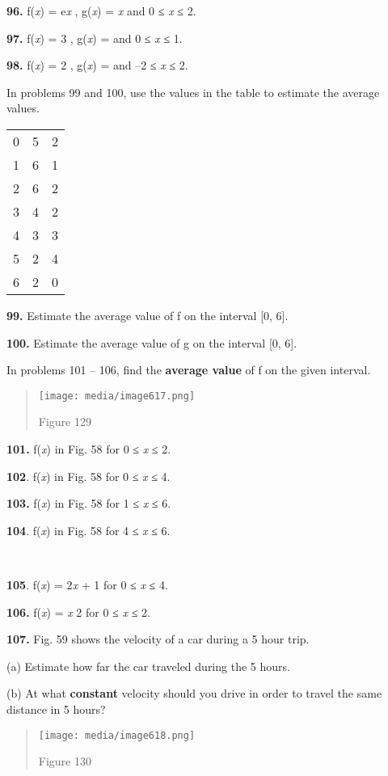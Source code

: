 \textbf{96.} f(\emph{x}) = e\emph{x} , g(\emph{x}) = \emph{x} and 0 ≤
\emph{x} ≤ 2.

\textbf{97.} f(\emph{x}) = 3 , g(\emph{x}) = and 0 ≤ \emph{x} ≤ 1.

\textbf{98.} f(\emph{x}) = 2 , g(\emph{x}) = and --2 ≤ \emph{x} ≤ 2.

In problems 99 and 100, use the values in the table to estimate the
average values.

\begin{longtable}[]{@{}lll@{}}
\toprule
0 & 5 & 2\tabularnewline
1 & 6 & 1\tabularnewline
2 & 6 & 2\tabularnewline
3 & 4 & 2\tabularnewline
4 & 3 & 3\tabularnewline
5 & 2 & 4\tabularnewline
6 & 2 & 0\tabularnewline
\bottomrule
\end{longtable}

\textbf{99.} Estimate the average value of f on the interval {[}0, 6{]}.

\textbf{100.} Estimate the average value of g on the interval {[}0,
6{]}.

In problems 101 -- 106, find the \textbf{average value} of f on the
given interval.

\begin{quote}
\texttt{[image: media/image617.png]}

Figure 129
\end{quote}

\textbf{101.} f(\emph{x}) in Fig. 58 for 0 ≤ \emph{x} ≤ 2.

\textbf{102}. f(\emph{x}) in Fig. 58 for 0 ≤ \emph{x} ≤ 4.

\textbf{103.} f(\emph{x}) in Fig. 58 for 1 ≤ \emph{x} ≤ 6.

\textbf{104}. f(\emph{x}) in Fig. 58 for 4 ≤ \emph{x} ≤ 6.

\textbf{\\
}

\textbf{105}. f(\emph{x}) = 2\emph{x} + 1 for 0 ≤ \emph{x} ≤ 4.

\textbf{106.} f(\emph{x}) = \emph{x} 2 for 0 ≤ \emph{x} ≤ 2.

\textbf{107.} Fig. 59 shows the velocity of a car during a 5 hour trip.

(a) Estimate how far the car traveled during the 5 hours.

(b) At what \textbf{constant} velocity should you drive in order to
travel the same distance in 5 hours?

\begin{quote}
\texttt{[image: media/image618.png]}

Figure 130
\end{quote}

